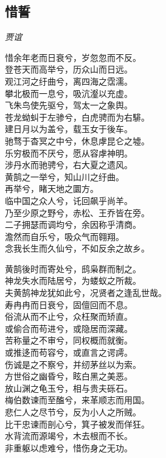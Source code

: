 \documentclass[]{article}
\begin{document}
\hypertarget{header-n208}{%
\subsection{惜誓}\label{header-n208}}

\emph{贾谊}

惜余年老而日衰兮，岁忽忽而不反。\\
登苍天而高举兮，历众山而日远。\\
观江河之纡曲兮，离四海之霑濡。\\
攀北极而一息兮，吸沆瀣以充虚。\\
飞朱鸟使先驱兮，驾太一之象舆。\\
苍龙蚴虯于左骖兮，白虎骋而为右騑。\\
建日月以为盖兮，载玉女于後车。\\
驰骛于杳冥之中兮，休息虖昆仑之墟。\\
乐穷极而不厌兮，愿从容虖神明。\\
涉丹水而驰骋兮，右大夏之遗风。\\
黄鹄之一举兮，知山川之纡曲。\\
再举兮，睹天地之圜方。\\
临中国之众人兮，讬回飙乎尚羊。\\
乃至少原之野兮，赤松、王乔皆在旁。\\
二子拥瑟而调均兮，余因称乎清商。\\
澹然而自乐兮，吸众气而翱翔。\\
念我长生而久仙兮，不如反余之故乡。

黄鹄後时而寄处兮，鸱枭群而制之。\\
神龙失水而陆居兮，为蝼蚁之所裁。\\
夫黄鹄神龙犹如此兮，况贤者之逢乱世哉。\\
寿冉冉而日衰兮，固儃回而不息。\\
俗流从而不止兮，众枉聚而矫直。\\
或偷合而苟进兮，或隐居而深藏。\\
苦称量之不审兮，同权概而就衡。\\
或推迻而苟容兮，或直言之谔謣。\\
伤诚是之不察兮，并纫茅丝以为索。\\
方世俗之幽昏兮，眩白黑之美恶。\\
放山渊之龟玉兮，相与贵夫砾石。\\
梅伯数谏而至醢兮，来革顺志而用国。\\
悲仁人之尽节兮，反为小人之所贼。\\
比干忠谏而剖心兮，箕子被发而佯狂。\\
水背流而源竭兮，木去根而不长。\\
非重躯以虑难兮，惜伤身之无功。
\end{document}
